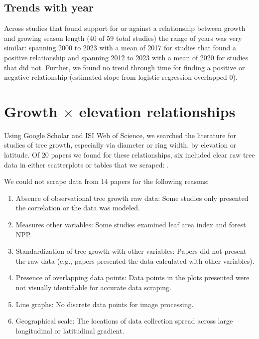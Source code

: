 \documentclass[11pt]{article}
\begin{document}
\subsection*{Trends with year}
Across studies that found support for or against a relationship between growth and growing season length (40 of 59 total studies) the range of years was very similar: spanning 2000 to 2023 with a mean of 2017 for studies that found a positive relationship and spanning 2012 to 2023 with a mean of 2020 for studies that did not. Further, we found no trend through time for finding a positive or negative relationship  (estimated slope from logistic regression overlapped 0). 

\section*{Growth $\times$ elevation relationships}

Using Google Scholar and ISI Web of Science, we searched the literature for studies of tree growth, especially via diameter or ring width, by elevation or latitude. Of 20 papers we found for these relationships, six included clear raw tree data in either scatterplots or tables that we scraped: \citet{oleksyn1998growth,huang2010radial,cavin2017highest,wang2017climatic,zhu2018spatial,zhou2022altitudinal}. 

We could not scrape data from 14 papers for the following reasons: 
\begin{enumerate}
\item Absence of observational tree growth raw data: Some studies only presented the correlation or the data was modeled. 
\item  Measures other variables: Some studies examined leaf area index and forest NPP. 
\item  Standardization of tree growth with other variables: Papers did not present the raw data (e.g., papers presented the data calculated with other variables).
\item  Presence of overlapping data points: Data points in the plots presented were not visually identifiable for accurate data scraping.
\item Line graphs: No discrete data points for image processing. 
\item Geographical scale: The locations of data collection spread across large longitudinal or latitudinal gradient. 
\end{enumerate}
\end{document}
